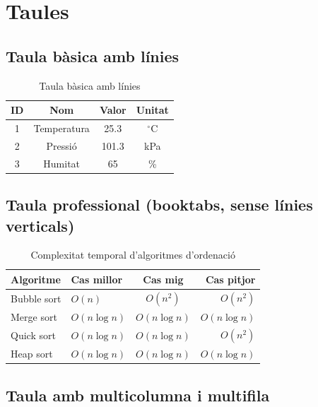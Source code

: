\documentclass[informe, catalan]{practicaitic}
\theoremstyle{definition}
\theoremstyle{remark}
\begin{document}
\section{Taules}

\subsection{Taula bàsica amb línies}

\begin{table}[H]
\centering
\begin{tabular}{|c|c|c|c|}
  \hline
  \textbf{ID} & \textbf{Nom} & \textbf{Valor} & \textbf{Unitat} \\
  \hline
  1 & Temperatura & 25.3 & $^\circ$C \\
  2 & Pressió     & 101.3 & kPa \\
  3 & Humitat     & 65 & \% \\
  \hline
\end{tabular}
\caption{Taula bàsica amb línies}
\label{tab:basica}
\end{table}

\subsection{Taula professional (booktabs, sense línies verticals)}

\begin{table}[H]
\centering
\begin{tabular}{llcr}
  \toprule
  \textbf{Algoritme} & \textbf{Cas millor} & \textbf{Cas mig} & \textbf{Cas pitjor} \\
  \midrule
  Bubble sort  & $O(n)$        & $O(n^2)$      & $O(n^2)$      \\
  Merge sort   & $O(n \log n)$ & $O(n \log n)$ & $O(n \log n)$ \\
  Quick sort   & $O(n \log n)$ & $O(n \log n)$ & $O(n^2)$      \\
  Heap sort    & $O(n \log n)$ & $O(n \log n)$ & $O(n \log n)$ \\
  \bottomrule
\end{tabular}
\caption{Complexitat temporal d'algoritmes d'ordenació}
\label{tab:complexitat}
\end{table}

\subsection{Taula amb multicolumna i multifila}
\end{document}
